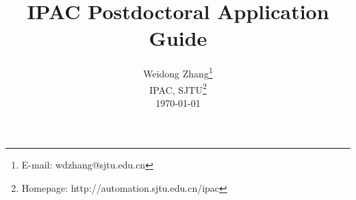 \newcommand*{\affaddr}[1]{#1}
\title{\Large\bfseries IPAC Postdoctoral Application Guide}
\author{
	Weidong Zhang\thanks{E-mail: wdzhang@sjtu.edu.cn}\\
\affaddr{IPAC, SJTU\thanks{Homepage: http://automation.sjtu.edu.cn/ipac}}\\
\today
}

\maketitle

